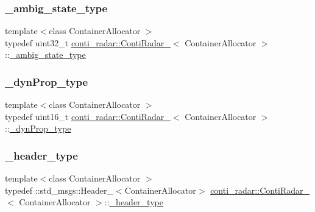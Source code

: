 \subsubsection{\texorpdfstring{\+\_\+ambig\+\_\+state\+\_\+type}{\_ambig\_state\_type}}
{\footnotesize\ttfamily template$<$class Container\+Allocator $>$ \\
typedef uint32\+\_\+t \hyperlink{structconti__radar_1_1ContiRadar__}{conti\+\_\+radar\+::\+Conti\+Radar\+\_\+}$<$ Container\+Allocator $>$\+::\hyperlink{structconti__radar_1_1ContiRadar___a193834825a012bc4ef64220db985d2eb}{\+\_\+ambig\+\_\+state\+\_\+type}}

\mbox{\label{structconti__radar_1_1ContiRadar___aa7a6bebffccc2d73549b176d1230e1dc}} 
\subsubsection{\texorpdfstring{\+\_\+dyn\+Prop\+\_\+type}{\_dynProp\_type}}
{\footnotesize\ttfamily template$<$class Container\+Allocator $>$ \\
typedef uint16\+\_\+t \hyperlink{structconti__radar_1_1ContiRadar__}{conti\+\_\+radar\+::\+Conti\+Radar\+\_\+}$<$ Container\+Allocator $>$\+::\hyperlink{structconti__radar_1_1ContiRadar___aa7a6bebffccc2d73549b176d1230e1dc}{\+\_\+dyn\+Prop\+\_\+type}}

\mbox{\label{structconti__radar_1_1ContiRadar___a0e76e7ae9ddced00c45c5935daea918f}} 
\subsubsection{\texorpdfstring{\+\_\+header\+\_\+type}{\_header\_type}}
{\footnotesize\ttfamily template$<$class Container\+Allocator $>$ \\
typedef \+::std\+\_\+msgs\+::\+Header\+\_\+$<$Container\+Allocator$>$ \hyperlink{structconti__radar_1_1ContiRadar__}{conti\+\_\+radar\+::\+Conti\+Radar\+\_\+}$<$ Container\+Allocator $>$\+::\hyperlink{structconti__radar_1_1ContiRadar___a0e76e7ae9ddced00c45c5935daea918f}{\+\_\+header\+\_\+type}}

